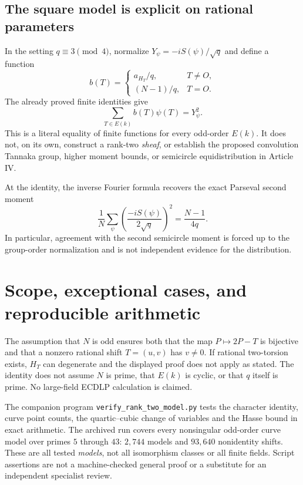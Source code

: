 \documentclass[11pt,a4paper]{article}
\numberwithin{equation}{section}
\begin{document}
\subsection{The square model is explicit on rational parameters}
In the setting \(q\equiv3\pmod4\), normalize
\(Y_\psi=-iS(\psi)/\sqrt q\) and define a function
\[
 b(T)=\begin{cases}
  a_{H_T}/q,&T\ne O,\\[2pt]
  (N-1)/q,&T=O.
 \end{cases}
\]
The already proved finite identities give
\begin{equation}\label{eq:finite-square}
\boxed{\sum_{T\in E(k)} b(T)\psi(T)=Y_\psi^2.}
\end{equation}
This is a literal equality of finite functions for every odd-order
\(E(k)\). It does not, on its own, construct a rank-two \emph{sheaf},
or establish the proposed convolution Tannaka group, higher moment
bounds, or semicircle equidistribution in Article IV.

At the identity, the inverse Fourier formula recovers the exact
Parseval second moment
\[
\frac1N\sum_\psi\left(\frac{-iS(\psi)}{2\sqrt q}\right)^2
 =\frac{N-1}{4q}.
\]
In particular, agreement with the second semicircle moment is
forced up to the group-order normalization and is not independent
evidence for the distribution.

\section{Scope, exceptional cases, and reproducible arithmetic}
The assumption that \(N\) is odd ensures both that the map
\(P\mapsto2P-T\) is bijective and that a nonzero rational shift
\(T=(u,v)\) has \(v\ne0\). If rational two-torsion exists,
\(H_T\) can degenerate and the displayed proof does not apply as
stated. The identity does not assume \(N\) is prime, that \(E(k)\)
is cyclic, or that \(q\) itself is prime. No large-field ECDLP
calculation is claimed.

The companion program \texttt{verify\_rank\_two\_model.py} tests the
character identity, curve point counts, the quartic--cubic change of
variables and the Hasse bound in exact arithmetic. The archived run
covers every nonsingular odd-order curve model over primes \(5\) through
\(43\): \(2{,}744\) models and \(93{,}640\) nonidentity shifts.
These are all tested \emph{models}, not all isomorphism classes or all
finite fields. Script assertions are not a machine-checked general
proof or a substitute for an independent specialist review.
\end{document}
